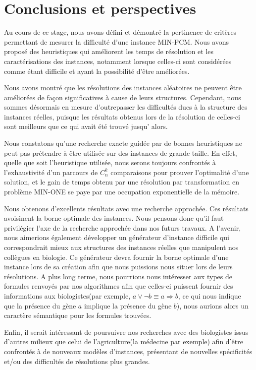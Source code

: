 \section{Conclusions et perspectives} 
Au cours de ce stage, nous avons défini  et démontré la pertinence de critères permettant de mesurer la difficulté d'une instance MIN-PCM. Nous avons proposé des heuristiques qui améliorent les temps de résolution et les caractérisations des instances, notamment lorsque celles-ci sont considérées comme étant difficile et ayant la possibilité d'être améliorées. 

Nous avons montré que les résolutions des instances aléatoires ne peuvent être améliorées de façon significatives à cause de leurs structures. Cependant, nous sommes désormais en mesure d'outrepasser les difficultés dues à la structure des instances réelles, puisque les résultats obtenus lors de la résolution de celles-ci sont meilleurs que ce qui avait été trouvé jusqu' alors. 

Nous constatons qu'une recherche exacte guidée par de bonnes heuristiques ne peut pas prétendre à être utilisée sur des instances de grande taille. En effet, quelle que soit l'heuristique utilisée, nous serons toujours confrontés à l'exhaustivité d'un parcours de $C_n^k$ comparaisons pour prouver l'optimalité d'une solution, et le gain de temps obtenu par une résolution par transformation en problème MIN-ONE se paye par une occupation exponentielle de la mémoire. 

Nous obtenons d'excellents résultats avec une recherche approchée. Ces résultats avoisinent la borne optimale des instances. Nous pensons donc qu'il faut privilégier l'axe de la recherche approchée dans nos futurs travaux. A l'avenir, nous aimerions également développer un générateur d'instance difficile qui correspondrait mieux aux structures des instances réelles que manipulent nos collègues en biologie. Ce générateur devra fournir la borne optimale d'une instance lors de sa création afin que nous puissions nous situer lors de leurs résolutions. A plus long terme, nous pourrions nous intéresser aux types de formules renvoyés par nos algorithmes afin que celles-ci puissent fournir des informations aux biologistes(par exemple, $a \lor \lnot b \equiv a \Rightarrow b$, ce qui nous indique que la présence du gène $a$ implique la présence du gène $b$), nous aurions alors un caractère sémantique pour les formules trouvées. 

Enfin, il serait intéressant de poursuivre nos recherches avec des biologistes issus d'autres milieux que celui de l'agriculture(la médecine par exemple) afin d'être confrontés à de nouveaux modèles d'instances, présentant de nouvelles spécificités et/ou des difficultés de résolutions plus grandes.


